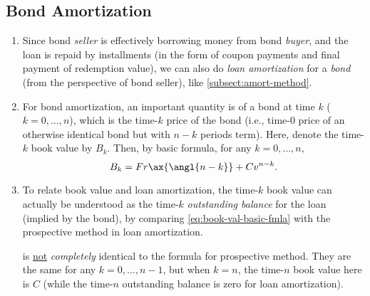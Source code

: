 \subsection{Bond Amortization}
\begin{enumerate}
\item Since bond \emph{seller} is effectively borrowing money from bond
\emph{buyer}, and the loan is repaid by installments (in the form of  coupon
payments and final payment of redemption value), we can also do \emph{loan
amortization} for a \emph{bond} (from the perspective of bond seller), like
\cref{subsect:amort-method}.

\item \label{it:book-value-prosp-fmla}
For bond amortization, an important quantity is  of a
bond at time \(k\) (\(k=0,\dotsc,n\)), which is the time-\(k\) price of the
bond (i.e., time-0 price of an otherwise identical bond but with \(n-k\)
periods term). Here, denote the time-\(k\) book value by \(B_k\). Then, by
basic formula, for any \(k=0,\dotsc,n\),
\begin{equation}
\label{eq:book-val-basic-fmla}
B_k=Fr\ax{\angl{n-k}}+Cv^{n-k}.
\end{equation}
\item To relate book value and loan amortization, the time-\(k\) book value can
actually be understood as the time-\(k\) \emph{outstanding balance} for the
loan (implied by the bond), by comparing \cref{eq:book-val-basic-fmla} with the
prospective method in loan amortization.

\begin{warning}
 is \underline{not} \emph{completely} identical to the formula
for prospective method. They are the same for any \(k=0,\dotsc,n-1\), but when
\(k=n\), the time-\(n\) book value here is \(C\) (while the time-\(n\)
outstanding balance is zero for loan amortization).
\end{warning}


\end{enumerate}
